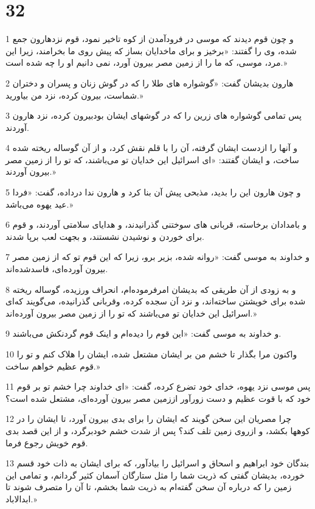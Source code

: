 \chapter{32}

\par 1 و چون قوم دیدند که موسی در فرودآمدن از کوه تاخیر نمود، قوم نزدهارون جمع شده، وی را گفتند: «برخیز و برای ماخدایان بساز که پیش روی ما بخرامند، زیرا این مرد، موسی، که ما را از زمین مصر بیرون آورد، نمی دانیم او را چه شده است.»
\par 2 هارون بدیشان گفت: «گوشواره های طلا را که در گوش زنان و پسران و دختران شماست، بیرون کرده، نزد من بیاورید.»
\par 3 پس تمامی گوشواره های زرین را که در گوشهای ایشان بودبیرون کرده، نزد هارون آوردند.
\par 4 و آنها را ازدست ایشان گرفته، آن را با قلم نقش کرد، و از آن گوساله ریخته شده ساخت، و ایشان گفتند: «ای اسرائیل این خدایان تو می‌باشند، که تو را از زمین مصر بیرون آوردند.»
\par 5 و چون هارون این را بدید، مذبحی پیش آن بنا کرد و هارون ندا درداده، گفت: «فردا عید یهوه می‌باشد.»
\par 6 و بامدادان برخاسته، قربانی های سوختنی گذرانیدند، و هدایای سلامتی آوردند، و قوم برای خوردن و نوشیدن نشستند، و بجهت لعب برپا شدند.
\par 7 و خداوند به موسی گفت: «روانه شده، بزیر برو، زیرا که این قوم تو که از زمین مصر بیرون آورده‌ای، فاسدشده‌اند.
\par 8 و به زودی از آن طریقی که بدیشان امرفرموده‌ام، انحراف ورزیده، گوساله ریخته شده برای خویشتن ساخته‌اند، و نزد آن سجده کرده، وقربانی گذرانیده، می‌گویند که‌ای اسرائیل این خدایان تو می‌باشند که تو را از زمین مصر بیرون آورده‌اند.»
\par 9 و خداوند به موسی گفت: «این قوم را دیده‌ام و اینک قوم گردنکش می‌باشند.
\par 10 واکنون مرا بگذار تا خشم من بر ایشان مشتعل شده، ایشان را هلاک کنم و تو را قوم عظیم خواهم ساخت.»
\par 11 پس موسی نزد یهوه، خدای خود تضرع کرده، گفت: «ای خداوند چرا خشم تو بر قوم خود که با قوت عظیم و دست زورآور اززمین مصر بیرون آورده‌ای، مشتعل شده است؟
\par 12 چرا مصریان این سخن گویند که ایشان را برای بدی بیرون آورد، تا ایشان را در کوهها بکشد، و ازروی زمین تلف کند؟ پس از شدت خشم خودبرگرد، و از این قصد بدی قوم خویش رجوع فرما.
\par 13 بندگان خود ابراهیم و اسحاق و اسرائیل را بیادآور، که برای ایشان به ذات خود قسم خورده، بدیشان گفتی که ذریت شما را مثل ستارگان آسمان کثیر گردانم، و تمامی این زمین را که درباره آن سخن گفته‌ام به ذریت شما بخشم، تا آن را متصرف شوند تا ابدالاباد.»
